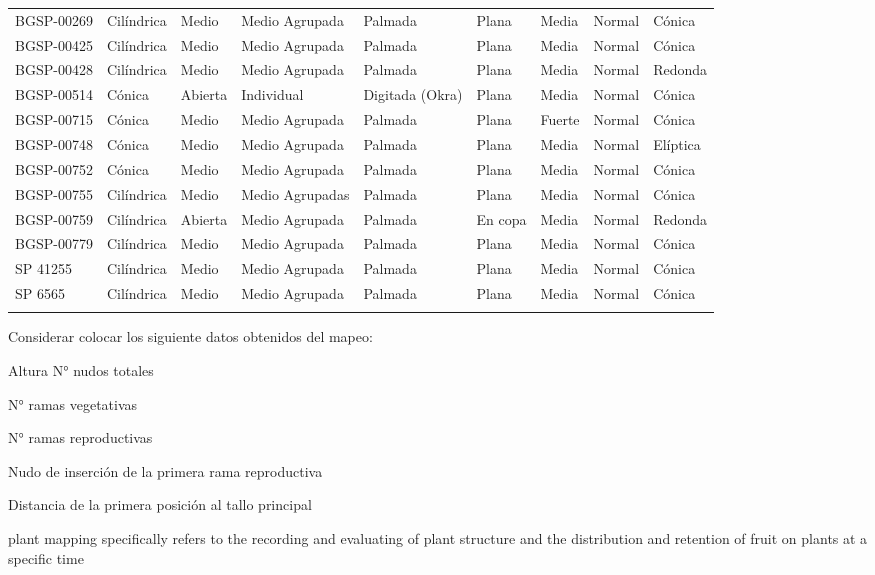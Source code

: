 \documentclass[12pt,oneside]{reedthesis}
\begin{document}
\begin{table}[!h]
{\begin{tabular}[t]{>{\raggedright\arraybackslash}p{6em}llllllll}
BGSP-00269 & Cilíndrica & Medio & Medio Agrupada & Palmada & Plana & Media & Normal & Cónica\\
\addlinespace
BGSP-00425 & Cilíndrica & Medio & Medio Agrupada & Palmada & Plana & Media & Normal & Cónica\\
BGSP-00428 & Cilíndrica & Medio & Medio Agrupada & Palmada & Plana & Media & Normal & Redonda\\
BGSP-00514 & Cónica & Abierta & Individual & Digitada (Okra) & Plana & Media & Normal & Cónica\\
BGSP-00715 & Cónica & Medio & Medio Agrupada & Palmada & Plana & Fuerte & Normal & Cónica\\
BGSP-00748 & Cónica & Medio & Medio Agrupada & Palmada & Plana & Media & Normal & Elíptica\\
\addlinespace
BGSP-00752 & Cónica & Medio & Medio Agrupada & Palmada & Plana & Media & Normal & Cónica\\
BGSP-00755 & Cilíndrica & Medio & Medio Agrupadas & Palmada & Plana & Media & Normal & Cónica\\
BGSP-00759 & Cilíndrica & Abierta & Medio Agrupada & Palmada & En copa & Media & Normal & Redonda\\
BGSP-00779 & Cilíndrica & Medio & Medio Agrupada & Palmada & Plana & Media & Normal & Cónica\\
SP 41255 & Cilíndrica & Medio & Medio Agrupada & Palmada & Plana & Media & Normal & Cónica\\
\addlinespace
SP 6565 & Cilíndrica & Medio & Medio Agrupada & Palmada & Plana & Media & Normal & Cónica\\
\bottomrule
\multicolumn{9}{l}{\textsuperscript{} aquí footnote}\\
\end{tabular}}
\end{table}

Considerar colocar los siguiente datos obtenidos del mapeo:

Altura N° nudos totales

N° ramas vegetativas

N° ramas reproductivas

Nudo de inserción de la primera rama reproductiva

Distancia de la primera posición al tallo principal

plant mapping specifically refers to the recording and evaluating of plant structure and the distribution and retention of fruit on plants at a specific time \autocite{kerby2010}
\end{document}
